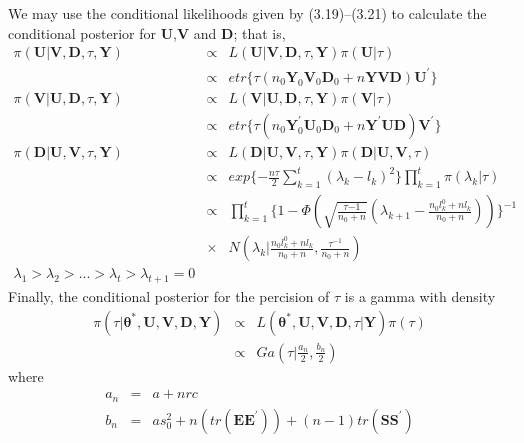We may use the conditional likelihoods given by (3.19)--(3.21) to calculate the conditional posterior for \textbf{U},\textbf{V} and \textbf{D}; that is,
\begin{eqnarray}
	\pi(\textbf{U}|\textbf{V},\textbf{D},\tau,\textbf{Y})&\varpropto& L(\textbf{U}|\textbf{V},\textbf{D},\tau,\textbf{Y})\pi(\textbf{U}|\tau) \nonumber \\
	&\varpropto& etr\{\tau(n_0\textbf{Y}_0\textbf{V}_0\textbf{D}_0+n\textbf{YVD})\textbf{U}^\prime\} \\
	\pi(\textbf{V}|\textbf{U},\textbf{D},\tau,\textbf{Y})&\varpropto& L(\textbf{V}|\textbf{U},\textbf{D},\tau,\textbf{Y})\pi(\textbf{V}|\tau) \nonumber \\
		&\varpropto& etr\{\tau(n_0\textbf{Y}_0^\prime \textbf{U}_0\textbf{D}_0+n\textbf{Y}^\prime \textbf{UD})\textbf{V}^\prime\} \\
	\pi(\textbf{D}|\textbf{U},\textbf{V},\tau,\textbf{Y})&\varpropto& L(\textbf{D}|\textbf{U},\textbf{V},\tau,\textbf{Y})\pi(\textbf{D}|\textbf{U},\textbf{V},\tau) \nonumber \\
	&\varpropto& exp\{-\frac{n\tau}{2}\sum_{k=1}^{t}(\lambda_k-l_k)^2\}\prod_{k=1}^{t}\pi(\lambda_k|\tau) \nonumber \\
	&\varpropto& \prod_{k=1}^{t}\{1-\Phi( \sqrt{\frac{\tau{-1}}{n_0+n}} (\lambda_{k+1}-\frac{n_0l_k^0+nl_k}{n_0+n}  )  ) \}^{-1} \nonumber \\
	&\times& N(\lambda_k|\frac{n_0l_k^0+nl_k}{n_0+n},\frac{\tau^{-1}}{n_0+n} ) \nonumber \\
	\lambda_1 >\lambda_2 > . . . >\lambda_t >\lambda_{t+1}=0 \nonumber 
	\end{eqnarray}
	Finally, the conditional posterior for the percision of $\tau$ is a gamma with density  
\begin{eqnarray}
	\pi (\tau|\bm{\theta}^*,\textbf{U},\textbf{V},\textbf{D},\textbf{Y})&\varpropto& L(\bm{\theta}^*,\textbf{U},\textbf{V},\textbf{D},\tau|\textbf{Y}) \pi(\tau) \nonumber\\
	&\varpropto& Ga(\tau|\frac{a_n}{2},\frac{b_n}{2}) \nonumber
\end{eqnarray}
where
\begin{eqnarray}
	a_n&=& a+nrc  \nonumber\\
	b_n&=& as_0^2+n(tr(\textbf{EE}^\prime))+(n-1)tr(\textbf{SS}^\prime) \nonumber
\end{eqnarray}
